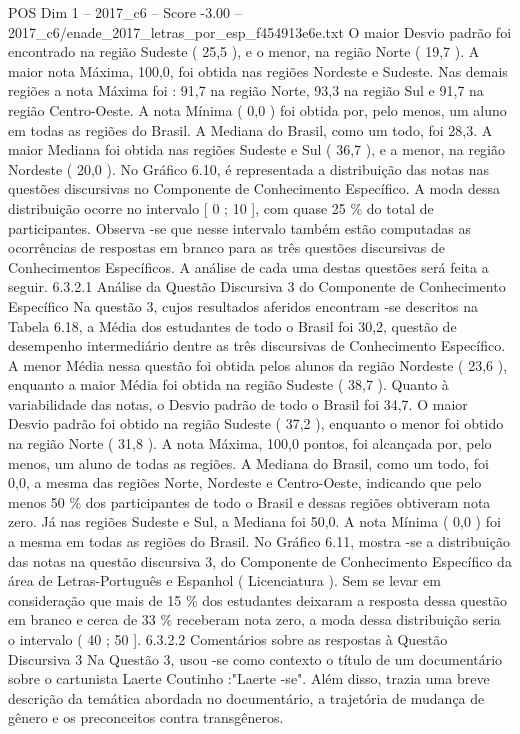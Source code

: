 \begin{textsample}{POS Dim 1 – 2017\_c6 – Score -3.00 – 2017\_c6/enade\_2017\_letras\_por\_esp\_f454913e6e.txt}
O maior Desvio padrão foi encontrado na região Sudeste ( 25,5 ), e o menor, na região Norte ( 19,7 ).
A maior nota Máxima, 100,0, foi obtida nas regiões Nordeste e Sudeste.
Nas demais regiões a nota Máxima foi : 91,7 na região Norte, 93,3 na região Sul e 91,7 na região Centro-Oeste.
A nota Mínima ( 0,0 ) foi obtida por, pelo menos, um aluno em todas as regiões do Brasil.
A Mediana do Brasil, como um todo, foi 28,3.
A maior Mediana foi obtida nas regiões Sudeste e Sul ( 36,7 ), e a menor, na região Nordeste ( 20,0 ).
No Gráfico 6.10, é representada a distribuição das notas nas questões discursivas no Componente de Conhecimento Específico.
A moda dessa distribuição ocorre no intervalo [ 0 ; 10 ], com quase 25 \% do total de participantes.
Observa -se que nesse intervalo também estão computadas as ocorrências de respostas em branco para as três questões discursivas de Conhecimentos Específicos.
A análise de cada uma destas questões será feita a seguir. 6.3.2.1 Análise da Questão Discursiva 3 do Componente de Conhecimento Específico Na questão 3, cujos resultados aferidos encontram -se descritos na Tabela 6.18, a Média dos estudantes de todo o Brasil foi 30,2, questão de desempenho intermediário dentre as três discursivas de Conhecimento Específico.
A menor Média nessa questão foi obtida pelos alunos da região Nordeste ( 23,6 ), enquanto a maior Média foi obtida na região Sudeste ( 38,7 ).
Quanto à variabilidade das notas, o Desvio padrão de todo o Brasil foi 34,7.
O maior Desvio padrão foi obtido na região Sudeste ( 37,2 ), enquanto o menor foi obtido na região Norte ( 31,8 ).
A nota Máxima, 100,0 pontos, foi alcançada por, pelo menos, um aluno de todas as regiões.
A Mediana do Brasil, como um todo, foi 0,0, a mesma das regiões Norte, Nordeste e Centro-Oeste, indicando que pelo menos 50 \% dos participantes de todo o Brasil e dessas regiões obtiveram nota zero.
Já nas regiões Sudeste e Sul, a Mediana foi 50,0.
A nota Mínima ( 0,0 ) foi a mesma em todas as regiões do Brasil.
No Gráfico 6.11, mostra -se a distribuição das notas na questão discursiva 3, do Componente de Conhecimento Específico da área de Letras-Português e Espanhol ( Licenciatura ).
Sem se levar em consideração que mais de 15 \% dos estudantes deixaram a resposta dessa questão em branco e cerca de 33 \% receberam nota zero, a moda dessa distribuição seria o intervalo ( 40 ; 50 ]. 6.3.2.2 Comentários sobre as respostas à Questão Discursiva 3 Na Questão 3, usou -se como contexto o título de um documentário sobre o cartunista Laerte Coutinho :"Laerte -se".
Além disso, trazia uma breve descrição da temática abordada no documentário, a trajetória de mudança de gênero e os preconceitos contra transgêneros.

\end{textsample}
